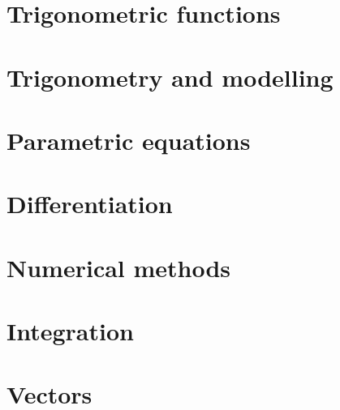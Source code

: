 \documentclass[oneside,fleqn,11pt]{book}
\begin{document}
\chapter{Trigonometric functions}


\chapter{Trigonometry and modelling}


\chapter{Parametric equations}


\chapter{Differentiation}


\chapter{Numerical methods}


\chapter{Integration}


\chapter{Vectors}

\end{document}
